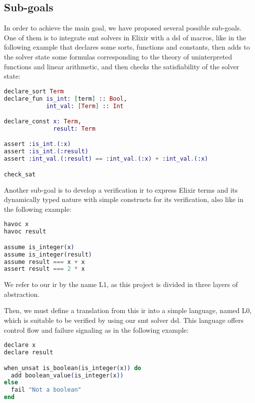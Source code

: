 \subsection{Sub-goals}

In order to achieve the main goal, we have proposed several possible sub-goals.
One of them is to integrate \acrshort{smt} solvers in Elixir with a \gls{dsl} of
macros, like in the following example that declares some sorts, functions and
constants, then adds to the solver state some formulas corresponding to the
theory of uninterpreted functions and linear arithmetic, and then checks the 
satisfiability of the solver state:

\begin{lstlisting}[language=elixir,numbers=none,frame=none]
declare_sort Term
declare_fun is_int: [term] :: Bool,
            int_val: [Term] :: Int

declare_const x: Term, 
              result: Term

assert :is_int.(:x)
assert :is_int.(:result)
assert :int_val.(:result) == :int_val.(:x) + :int_val.(:x)

check_sat
\end{lstlisting}

Another sub-goal is to develop a verification \gls{ir} to express Elixir terms
and its dynamically typed nature with simple constructs for its verification,
also like in the following example:

\begin{lstlisting}[language=elixir,numbers=none,frame=none]
havoc x
havoc result

assume is_integer(x)
assume is_integer(result)
assume result === x + x
assert result === 2 * x 
\end{lstlisting}

We refer to our \gls{ir} by the name L1, as this project is divided in three
layers of abstraction.

Then, we must define a translation from this \gls{ir} into a simple language,
named L0, which is suitable to be verified by using our \acrshort{smt} solver
\gls{dsl}. This language offers control flow and failure signaling as in the
following example:

\begin{lstlisting}[language=elixir,numbers=none,frame=none]
declare x
declare result 

when_unsat is_boolean(is_integer(x)) do 
  add boolean_value(is_integer(x))
else 
  fail "Not a boolean"
end
\end{lstlisting}

